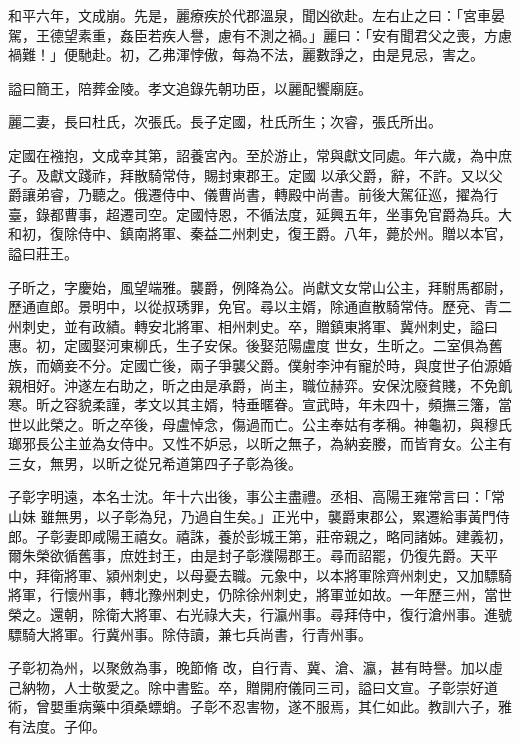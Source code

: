 \begin{pinyinscope}
 和平六年，文成崩。先是，麗療疾於代郡溫泉，聞凶欲赴。左右止之曰：「宮車晏駕，王德望素重，姦臣若疾人譽，慮有不測之禍。」麗曰：「安有聞君父之喪，方慮禍難！」便馳赴。初，乙弗渾悖傲，每為不法，麗數諍之，由是見忌，害之。



 謚曰簡王，陪葬金陵。孝文追錄先朝功臣，以麗配饗廟庭。



 麗二妻，長曰杜氏，次張氏。長子定國，杜氏所生；次睿，張氏所出。



 定國在襁抱，文成幸其第，詔養宮內。至於游止，常與獻文同處。年六歲，為中庶子。及獻文踐祚，拜散騎常侍，賜封東郡王。定國
 以承父爵，辭，不許。又以父爵讓弟睿，乃聽之。俄遷侍中、儀曹尚書，轉殿中尚書。前後大駕征巡，擢為行臺，錄都曹事，超遷司空。定國恃恩，不循法度，延興五年，坐事免官爵為兵。大和初，復除侍中、鎮南將軍、秦益二州刺史，復王爵。八年，薨於州。贈以本官，謚曰莊王。



 子昕之，字慶始，風望端雅。襲爵，例降為公。尚獻文女常山公主，拜駙馬都尉，歷通直郎。景明中，以從叔琇罪，免官。尋以主婿，除通直散騎常侍。歷兗、青二州刺史，並有政績。轉安北將軍、相州刺史。卒，贈鎮東將軍、冀州刺史，謚曰惠。初，定國娶河東柳氏，生子安保。後娶范陽盧度
 世女，生昕之。二室俱為舊族，而嫡妾不分。定國亡後，兩子爭襲父爵。僕射李沖有寵於時，與度世子伯源婚親相好。沖遂左右助之，昕之由是承爵，尚主，職位赫弈。安保沈廢貧賤，不免飢寒。昕之容貌柔謹，孝文以其主婿，特垂暱眷。宣武時，年未四十，頻撫三籓，當世以此榮之。昕之卒後，母盧悼念，傷過而亡。公主奉姑有孝稱。神龜初，與穆氏瑯邪長公主並為女侍中。又性不妒忌，以昕之無子，為納妾媵，而皆育女。公主有三女，無男，以昕之從兄希道第四子子彰為後。



 子彰字明遠，本名士沈。年十六出後，事公主盡禮。丞相、高陽王雍常言曰：「常山妹
 雖無男，以子彰為兒，乃過自生矣。」正光中，襲爵東郡公，累遷給事黃門侍郎。子彰妻即咸陽王禧女。禧誅，養於彭城王第，莊帝親之，略同諸姊。建義初，爾朱榮欲循舊事，庶姓封王，由是封子彰濮陽郡王。尋而詔罷，仍復先爵。天平中，拜衛將軍、潁州刺史，以母憂去職。元象中，以本將軍除齊州刺史，又加驃騎將軍，行懷州事，轉北豫州刺史，仍除徐州刺史，將軍並如故。一年歷三州，當世榮之。還朝，除衛大將軍、右光祿大夫，行瀛州事。尋拜侍中，復行滄州事。進號驃騎大將軍。行冀州事。除侍讀，兼七兵尚書，行青州事。



 子彰初為州，以聚斂為事，晚節脩
 改，自行青、冀、滄、瀛，甚有時譽。加以虛己納物，人士敬愛之。除中書監。卒，贈開府儀同三司，謚曰文宣。子彰崇好道術，曾嬰重病藥中須桑螵蛸。子彰不忍害物，遂不服焉，其仁如此。教訓六子，雅有法度。子仰。




\end{pinyinscope}
